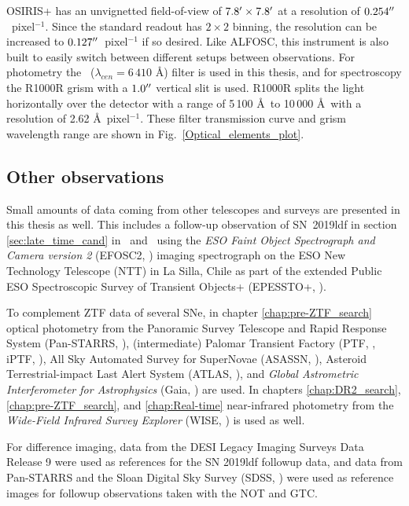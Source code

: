 \documentclass[a4paper,oneside,12pt, class=Latex/Classes/PhDthesisPSnPDF, crop=false]{standalone}
\begin{document}
OSIRIS+ has an unvignetted field-of-view of $7.8^{\prime}\times7.8^{\prime}$ at a resolution of $0.254^{\prime\prime}$~pixel$^{-1}$. Since the standard readout has $2\times2$ binning, the resolution can be increased to $0.127^{\prime\prime}$~pixel$^{-1}$ if so desired. Like ALFOSC, this instrument is also built to easily switch between different setups between observations. For photometry the \ztfr~($\lambda_{cen} =6\,410$ \AA) filter is used in this thesis, and for spectroscopy the R1000R grism with a $1.0^{\prime\prime}$ vertical slit is used. R1000R splits the light horizontally over the detector with a range of 5\,100 \AA\ to 10\,000 \AA\ with a resolution of 2.62 \AA\ pixel$^{-1}$. These filter transmission curve and grism wavelength range are shown in Fig.~\ref{Optical_elements_plot}.


\subsection{Other observations}
Small amounts of data coming from other telescopes and surveys are presented in this thesis as well. This includes a follow-up observation of SN~2019ldf in section \ref{sec:late_time_cand} in \ztfg\ and \ztfr\ using the \textit{ESO Faint Object Spectrograph and Camera version 2} (EFOSC2, \citealt{EFOSC2}) imaging spectrograph on the ESO New Technology Telescope (NTT) in La Silla, Chile as part of the extended Public ESO Spectroscopic Survey of Transient Objects+ (EPESSTO+, \citealt{PESSTO}).

To complement ZTF data of several SNe, in chapter \ref{chap:pre-ZTF_search} optical photometry from the Panoramic Survey Telescope and Rapid Response System (Pan-STARRS, \citealt{Pan-STARRS1}), (intermediate) Palomar Transient Factory (PTF, \citealt{PTF_1, PTF_2}, iPTF, \citealt{iPTF}), All Sky Automated Survey for SuperNovae (ASASSN, \citealt{ASASSN_paper1, ASASSN_catalog}), Asteroid Terrestrial-impact Last Alert System (ATLAS, \citealt{ATLAS}),  and \textit{Global Astrometric Interferometer for Astrophysics} (Gaia, \citealt{Gaia}) are used. In chapters \ref{chap:DR2_search}, \ref{chap:pre-ZTF_search}, and \ref{chap:Real-time} near-infrared photometry from the \textit{Wide-Field Infrared Survey Explorer} (WISE, \citealt{WISE}) is used as well.

For difference imaging, data from the DESI Legacy Imaging Surveys Data Release 9 \citep{DESI-Legacy_Imaging_Surveys} were used as references for the SN 2019ldf followup data, and data from Pan-STARRS and the Sloan Digital Sky Survey (SDSS, \citealt{SDSS-I-II, SDSS_DR4, SDSS_telescope, SDSS_Spectograph}) were used as reference images for followup observations taken with the NOT and GTC.
\end{document}
